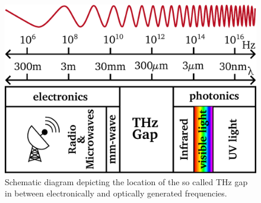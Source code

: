 \begin{figure}[!btp]
    \includegraphics[height=0.4\textwidth]{figures/THz_overview.pdf}
    \centering
    \caption{Schematic diagram depicting the location of the so called THz gap in between electronically and optically generated frequencies.}
    \label{thz_overview}
\end{figure}









